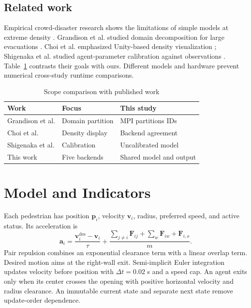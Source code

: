 \documentclass[conference]{IEEEtran}
\begin{document}
\subsection{Related work}
Empirical crowd-disaster research shows the limitations of simple models at extreme density \cite{helbing2007}. Grandison et al. studied domain decomposition for large evacuations \cite{grandison2017}. Choi et al. emphasized Unity-based density visualization \cite{choi2025}; Shigenaka et al. studied agent-parameter calibration against observations \cite{shigenaka2024}. Table~\ref{tab:prior} contrasts their goals with ours. Different models and hardware prevent numerical cross-study runtime comparisons.
\begin{table}[t]\caption{Scope comparison with published work}\label{tab:prior}\centering\footnotesize
\begin{tabular}{lll}\toprule Work & Focus & This study\\\midrule
Grandison et al. \cite{grandison2017} & Domain partition & MPI partitions IDs\\
Choi et al. \cite{choi2025} & Density display & Backend agreement\\
Shigenaka et al. \cite{shigenaka2024} & Calibration & Uncalibrated model\\
This work & Five backends & Shared model and output\\\bottomrule\end{tabular}\end{table}

\section{Model and Indicators}
Each pedestrian has position $\mathbf p_i$, velocity $\mathbf v_i$, radius, preferred speed, and active status. Its acceleration is
\begin{equation}\mathbf a_i=\frac{\mathbf v_i^{\mathrm{des}}-\mathbf v_i}{\tau}+\frac{\sum_{j\ne i}\mathbf F_{ij}+\sum_w\mathbf F_{iw}+\mathbf F_{i,o}}{m}.\end{equation}
Pair repulsion combines an exponential clearance term with a linear overlap term. Desired motion aims at the right-wall exit. Semi-implicit Euler integration updates velocity before position with $\Delta t=0.02$ s and a speed cap. An agent exits only when its center crosses the opening with positive horizontal velocity and radius clearance. An immutable current state and separate next state remove update-order dependence.
\end{document}
